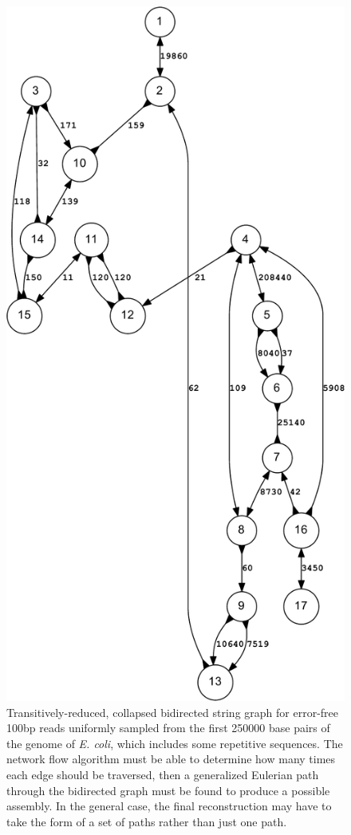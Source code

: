\documentclass[letterpaper,12pt]{article}
\begin{document}
\begin{figure}
\caption{Transitively-reduced, collapsed bidirected string graph for error-free
100bp reads uniformly sampled from the first 250000 base pairs of the genome of
{\it E. coli}, which includes some repetitive sequences.  The network flow
algorithm must be able to determine how many times each edge should be
traversed, then a generalized Eulerian path through the bidirected graph must be
found to produce a possible assembly.  In the general case, the final
reconstruction may have to take the form of a set of paths rather than just one
path.  }
\begin{center}
\includegraphics[scale=0.6]{E_coli-crop.pdf}
\end{center}
\end{figure}
\end{document}
